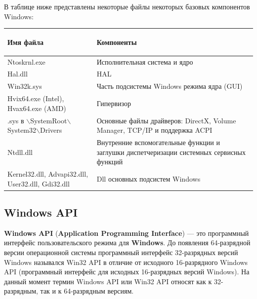 \documentclass[14pt, a4paper]{article}
\begin{document}
В таблице ниже представлены некоторые файлы некоторых базовых компонентов Windows:
\begin{center}
    \begin{tabularx}{\textwidth}{ |X|X| }
        \hline
        \begin{center}
            \textbf{Имя файла}
        \end{center}
         & 
        \begin{center}
            \textbf{Компоненты}
        \end{center} \\ [1.5ex]
          
        \hline
        Ntoskrnl.exe & Исполнительная система и ядро \\
        \hline   
        Hal.dll & HAL \\ 
        \hline
        Win32k.sys & Часть подсистемы Windows режима ядра (GUI) \\ 
        \hline
        Hvix64.exe (Intel), Hvax64.exe (AMD) & Гипервизор \\ 
        \hline
        .sys в $\backslash$SystemRoot$\backslash$System32$\backslash$Drivers & Основные файлы драйверов: DirectX, Volume Manager, TCP/IP и поддержка ACPI \\ 
        \hline
        Ntdll.dll & Внутренние вспомогательные функции и заглушки диспетчеризации системных сервисных функций \\
        \hline
        Kernel32.dll, Advapi32.dll, User32.dll, Gdi32.dll & Dll основных подсистем Windows \\
        \hline
    \end{tabularx}
\end{center}
    

\begin{centering}
    \subsection*{Windows API}
\end{centering}

\textbf{Windows API} (\textbf{Application Programming Interface}) — это программный интерфейс пользовательского режима для \textbf{Windows}.
До появления 64-разрядной версии операционной системы программный интерфейс 32-разрядных версий Windows
назывался Win32 API в отличие от исходного 16-разрядного Windows API (программный интерфейс для исходных
16-разрядных версий Windows). На данный момент термин Windows API или Win32 API относят как к 32-разрядным,
так и к 64-разрядным версиям.
\end{document}
